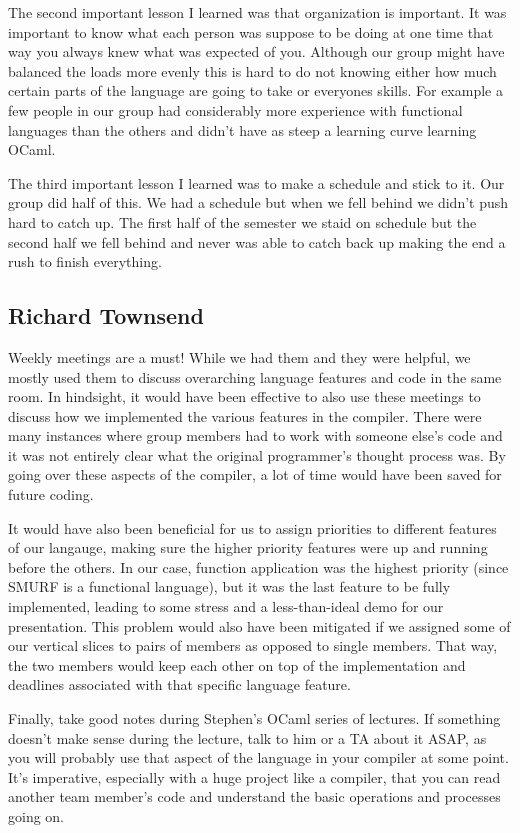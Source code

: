 The second important lesson I learned was that organization is important. It was important to know what each person was suppose 
to be doing at one time that way you always knew what was expected of you. Although our group might have balanced the loads more 
evenly this is hard to do not knowing either how much certain parts of the language are going to take or everyones skills. For 
example a few people in our group had considerably more experience with functional languages than the others and didn't have as 
steep a learning curve learning OCaml. 

The third important lesson I learned was to make a schedule and stick to it. Our group did half of this. We had a schedule but when 
we fell behind we didn't push hard to catch up. The first half of the semester we staid on schedule but the second half we fell 
behind and never was able to catch back up making the end a rush to finish everything. 

\subsection{Richard Townsend}
Weekly meetings are a must! While we had them and they were helpful, we mostly used them to discuss overarching language features and code in the same room.
In hindsight, it would have been effective to also use these meetings to discuss how we implemented the various features in the compiler. There were many
instances where group members had to work with someone else's code and it was not entirely clear what the original programmer's thought process was.
By going over these aspects of the compiler, a lot of time would have been saved for future coding.

It would have also been beneficial for us to assign priorities to different features of our langauge, making sure the higher priority features were
up and running before the others. In our case, function application was the highest priority (since SMURF is a functional language), but it was the last
feature to be fully implemented, leading to some stress and a less-than-ideal demo for our presentation. This problem would also have been mitigated if we assigned
some of our vertical slices to pairs of members as opposed to single members. That way, the two members would keep each other on top of the implementation and deadlines
associated with that specific language feature.

Finally, take good notes during Stephen's OCaml series of lectures. If something doesn't make sense during the lecture, talk to him or a TA about it ASAP, as you
will probably use that aspect of the language in your compiler at some point. It's imperative, especially with a huge project like a compiler, that you can read
another team member's code and understand the basic operations and processes going on.

